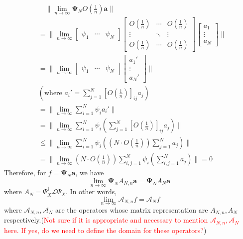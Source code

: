 \documentclass{article}[11]
\begin{document}
\begin{align*}
	&\quad \|\lim_{n\to\infty} \mathbf{\Psi}_N O(\tfrac{1}{n})\mathbf{a}\| \\
	&= \|\lim_{n\to\infty} 
	\begin{bmatrix}
		\psi_1 & \cdots & \psi_N
	\end{bmatrix}
	\begin{bmatrix}
		O(\tfrac{1}{n}) & \cdots & O(\tfrac{1}{n}) \\
		\vdots & \ddots & \vdots \\
		O(\tfrac{1}{n}) & \cdots & O(\tfrac{1}{n})
	\end{bmatrix}
	\begin{bmatrix}
		a_1 \\
		\vdots \\
		a_N
	\end{bmatrix} \| \\
	&= \|\lim_{n\to\infty} 
	\begin{bmatrix}
		\psi_1 & \cdots & \psi_N
	\end{bmatrix}
	\begin{bmatrix}
		a_1' \\
		\vdots \\
		a_N'
	\end{bmatrix} \| \\
	&(\text{where $a_i'=\sum_{j=1}^N [O(\tfrac{1}{n})]_{ij}a_j$}) \\
	&= \|\lim_{n\to\infty} \sum_{i=1}^N \psi_i a_i' \| \\
	&= \|\lim_{n\to\infty} \sum_{i=1}^N \psi_i \left( \sum_{j=1}^N [O(\tfrac{1}{n})]_{ij}a_j \right) \| \\
	&\leq \|\lim_{n\to\infty} \sum_{i=1}^N \psi_i \left( \left(N \cdot O(\tfrac{1}{n})\right) \sum_{j=1}^N a_j \right) \| \\
	&= \|\lim_{n\to\infty} \left(N \cdot O(\tfrac{1}{n})\right) \sum_{i,j=1}^N \psi_i \left( \sum_{i,j=1}^N a_j \right) \| = 0
\end{align*}
Therefore, for $f=\mathbf{\Psi}_N\mathbf{a}$, we have
$$\lim_{n\to\infty} \mathbf{\Psi}_N A_{N,n} \mathbf{a} = \mathbf{\Psi}_N A_N \mathbf{a}$$ 
where $A_N = \Psi_X^{\dagger}\mathcal{L}\Psi_X$. In other words,
$$
\lim_{n\to\infty} \mathcal{A}_{N,n} f = \mathcal{A}_N f
$$
where $\mathcal{A}_{N,n}, \mathcal{A}_N$ are the operators whose matrix representation are $A_{N,n}, A_N$ respectively.(\textcolor{red}{Not sure if it is appropriate and necessary to mention $\mathcal{A}_{N,n}, \mathcal{A}_N$ here. If yes, do we need to define the domain for these operators?})
\end{document}
